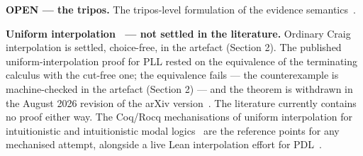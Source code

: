 \textbf{OPEN --- the tripos.} The tripos-level formulation of the
evidence
semantics~\cite{Hyland1982,VanOosten2008,CohenGrunfeldKirstMiquey2025}.

\textbf{Uniform interpolation~\cite{Pitts1992} --- not settled in the
literature.} Ordinary Craig interpolation is settled, choice-free, in
the artefact (Section 2). The published uniform-interpolation proof
for PLL rested on the equivalence of the terminating calculus with the
cut-free one; the equivalence fails --- the counterexample is
machine-checked in the artefact (Section 2) --- and the theorem is
withdrawn in the August 2026 revision of the arXiv
version~\cite{Iemhoff2024}. The literature currently contains no proof
either way. The Coq/Rocq mechanisations of uniform interpolation for
intuitionistic and intuitionistic modal
logics~\cite{FereeVanDerGiessenVanGoolShillito2024,
ShillitoVanDerGiessenGoreIemhoff2023,VanDerGiessenShillito2026}
are the reference points for any mechanised attempt, alongside a live
Lean interpolation effort for
PDL~\cite{GattingerLean4PDL}.
